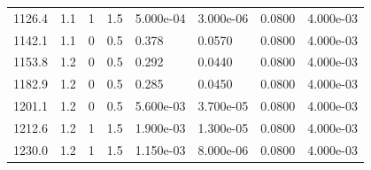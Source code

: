 \documentclass[preview]{standalone}
\begin{document}
{{\begin{tabular}{L{1.2cm}C{1.2cm} C{0.3cm}C{0.5cm} C{1.4cm}C{1.4cm} C{1.4cm}C{1.4cm}}
  1126.4  &   1.1  & 1     & 1.5 &  5.000e-04  & 3.000e-06  & 0.0800 &  4.000e-03   \\ 
  1142.1  &   1.1  & 0     & 0.5 &  0.378  & 0.0570  & 0.0800 &  4.000e-03   \\ 
  1153.8  &   1.2  & 0     & 0.5 &  0.292  & 0.0440  & 0.0800 &  4.000e-03   \\ 
  1182.9  &   1.2  & 0     & 0.5 &  0.285  & 0.0450  & 0.0800 &  4.000e-03   \\ 
  1201.1  &   1.2  & 0     & 0.5 &  5.600e-03  & 3.700e-05  & 0.0800 &  4.000e-03   \\ 
  1212.6  &   1.2  & 1     & 1.5 &  1.900e-03  & 1.300e-05  & 0.0800 &  4.000e-03   \\ 
  1230.0  &   1.2  & 1     & 1.5 &  1.150e-03  & 8.000e-06  & 0.0800 &  4.000e-03   \\ 
\hline 
\end{tabular} 

}}
\end{document}

